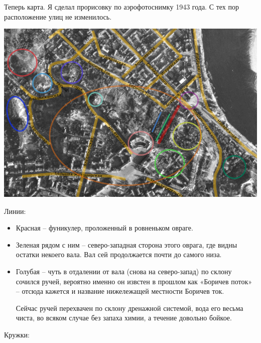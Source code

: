 Теперь карта. Я сделал прорисовку по аэрофотоснимку 1943 года. С тех пор расположение улиц не изменилось.
\vspace*{\fill}
\begin{center}
\includegraphics[width=\linewidth]{chast-colebanie-osnov/uvoz-borichev/bor-karta.jpg}
\end{center}
\vspace*{\fill}
\newpage

Линии:

\begin{itemize}
\item Красная – фуникулер, проложенный в ровненьком овраге.

\item Зеленая рядом с ним – северо-западная сторона этого оврага, где видны остатки некоего вала. Вал сей продолжается почти до самого низа.

\item Голубая – чуть в отдалении от вала (снова на северо-запад) по склону сочился ручей, вероятно именно он извстен в прошлом как «Боричев поток» – отсюда кажется и название нижележащей местности Боричев ток. 

Сейчас ручей перехвачен по склону дренажной системой, вода его весьма чиста, во всяком случае без запаха химии, а течение довольно бойкое.
\end{itemize}

Кружки:

